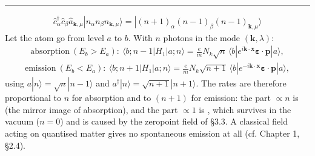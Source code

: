 \documentclass[letterpaper,10pt,english]{jupyterBook}
\begin{document}
\bigskip\hrule\bigskip

\begin{equation*}
\begin{split} \hat{c}_\alpha^\dagger \hat{c}_\beta \hat{a}_{\mathbf{k},\mu} | n_\alpha n_\beta n_{\mathbf{k}, \mu}\rangle = | (n+1)_\alpha (n-1)_\beta (n-1)_{\mathbf{k}, \mu}\rangle\end{split}
\end{equation*}
\sphinxAtStartPar
{} Let the atom go from level \(a\) to \(b\). With \(n\) photons in the mode \((\mathbf k,\lambda)\):
\begin{equation*}
\begin{split}
\text{absorption}\ (E_b>E_a):\ \langle b;n{-}1|H_1|a;n\rangle=\frac em N_k\sqrt n\,\langle b|e^{i\mathbf k\cdot\mathbf x}\boldsymbol\varepsilon\!\cdot\!\mathbf p|a\rangle,
\end{split}
\end{equation*}\begin{equation*}
\begin{split}
\text{emission}\ (E_b<E_a):\ \langle b;n{+}1|H_1|a;n\rangle=\frac em N_k\sqrt{n+1}\,\langle b|e^{-i\mathbf k\cdot\mathbf x}\boldsymbol\varepsilon\!\cdot\!\mathbf p|a\rangle,
\end{split}
\end{equation*}
\sphinxAtStartPar
using \(a|n\rangle=\sqrt n|n-1\rangle\) and \(a^\dagger|n\rangle=\sqrt{n+1}|n+1\rangle\). The rates are therefore proportional to \(n\) for absorption and to \((n+1)\) for emission: the part \(\propto n\) is  (the mirror image of absorption), and the part \(\propto1\) is , which survives in the vacuum (\(n=0\)) and is caused by the zero\sphinxhyphen{}point field of §3.3. A classical field acting on quantised matter gives no spontaneous emission at all (cf. Chapter 1, §2.4).
\end{document}
